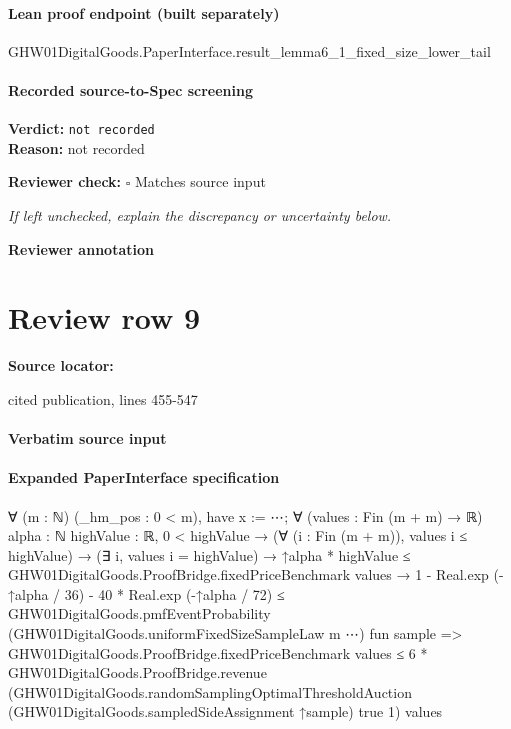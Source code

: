 \documentclass[10pt]{article}
\newcommand{\reviewerbox}{%
  \par\noindent\fbox{\parbox{0.96\linewidth}{\rule{0pt}{0.38in}}}\par
}
\newcommand{\reviewmatch}[1]{%
  \par\noindent\textbf{Reviewer check:} $\square$\; #1\par
  \noindent\emph{If left unchecked, explain the discrepancy or uncertainty below.}\par
}
\begin{document}
\paragraph{Lean proof endpoint (built separately)}\begin{ReviewVerbatim}
GHW01DigitalGoods.PaperInterface.result_lemma6_1_fixed_size_lower_tail
\end{ReviewVerbatim}

\paragraph{Recorded source-to-Spec screening}
\textbf{Verdict:} \texttt{not recorded}
\\
\textbf{Reason:} not recorded
\reviewmatch{Matches source input}
\noindent\textbf{Reviewer annotation}\par
\reviewerbox
\clearpage
\hypertarget{source-claim-dbcf1d32b28d9965}{}
\section*{Review row 9}
\textbf{Source locator:} {\footnotesize\raggedright cited publication, lines 455-\allowbreak{}547\par}
\paragraph{Verbatim source input}
\begin{ReviewVerbatim}
\end{ReviewVerbatim}


\paragraph{Expanded PaperInterface specification}
\begin{ReviewVerbatim}
∀ (m : ℕ) (_hm_pos : 0 < m),
  have x := ⋯;
  ∀ (values : Fin (m + m) → ℝ) {alpha : ℕ} {highValue : ℝ},
    0 < highValue →
      (∀ (i : Fin (m + m)), values i ≤ highValue) →
        (∃ i, values i = highValue) →
          ↑alpha * highValue ≤ GHW01DigitalGoods.ProofBridge.fixedPriceBenchmark values →
            1 - Real.exp (-↑alpha / 36) - 40 * Real.exp (-↑alpha / 72) ≤
              GHW01DigitalGoods.pmfEventProbability (GHW01DigitalGoods.uniformFixedSizeSampleLaw m ⋯) fun sample =>
                GHW01DigitalGoods.ProofBridge.fixedPriceBenchmark values ≤
                  6 *
                    GHW01DigitalGoods.ProofBridge.revenue
                      (GHW01DigitalGoods.randomSamplingOptimalThresholdAuction
                        (GHW01DigitalGoods.sampledSideAssignment ↑sample) true 1)
                      values
\end{ReviewVerbatim}
\end{document}
